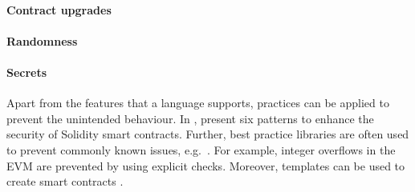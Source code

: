 \paragraph{Contract upgrades}

\paragraph{Randomness}

\paragraph{Secrets}

Apart from the features that a language supports, practices can be applied to prevent the unintended behaviour.
In \cite{Wohrer2018}, present six patterns to enhance the security of Solidity smart contracts.
Further, best practice libraries are often used to prevent commonly known issues, e.g.\ \cite{ConsenSys2018Security}.
For example, integer overflows in the EVM are prevented by using explicit checks.
Moreover, templates can be used to create smart contracts \cite{Clack2016}.
